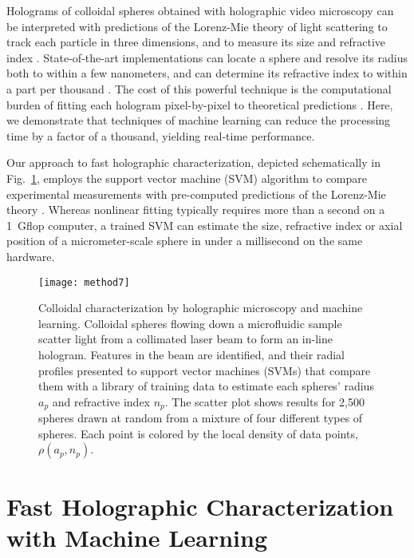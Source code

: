 \documentclass[10pt,letterpaper]{article}
\begin{document}
Holograms of colloidal spheres obtained 
with holographic video microscopy
\cite{sheng06,lee07}
can be interpreted with predictions of the Lorenz-Mie theory 
of light scattering \cite{bohren83}
to track each particle in three dimensions, and to measure 
its size and refractive index \cite{lee07a}.
State-of-the-art implementations \cite{lee07a,bourquard13,seifi13,fung13}
can locate a sphere and resolve its
radius both to within a few nanometers, and 
can determine its refractive index to within a part per thousand
\cite{cheong09,shpaisman12,krishnatreya14}.
The cost of this powerful technique is the computational burden of
fitting each hologram pixel-by-pixel to theoretical predictions
\cite{lee07a,cheong10a}.
Here, we demonstrate that techniques of machine learning
can reduce the processing time by a factor of a thousand,
yielding real-time performance.

Our approach to fast holographic characterization,
depicted schematically in Fig.~\ref{fig:method},
employs the support vector machine (SVM) algorithm
\cite{smola04} 
to compare experimental measurements with
pre-computed predictions of the Lorenz-Mie theory
\cite{bohren83,lee07a,krishnatreya14a}.
Whereas nonlinear fitting typically requires more than a second
on a \SI{1}{\giga flop} computer,
a trained SVM can estimate the size, refractive index or
axial position of a micrometer-scale sphere
in under a millisecond on the same hardware.

\begin{figure}
  \centering
  \texttt{[image: method7]}
  \caption{Colloidal characterization by holographic microscopy and
    machine learning.  Colloidal spheres flowing down a microfluidic
    sample scatter light from a collimated laser beam to form an
    in-line hologram.  Features in the beam are identified, and their
    radial profiles presented to support vector machines (SVMs)
    that compare them with a library of training data to estimate
    each spheres' radius $a_p$ and refractive index
    $n_p$.  The scatter plot shows results for 2,500 spheres
    drawn at random from a mixture of four different types of
    spheres.  Each point is colored by the local density of
    data points, $\rho(a_p,n_p)$.}
  \label{fig:method}
\end{figure}

\section{Fast Holographic Characterization with Machine Learning}
\end{document}
